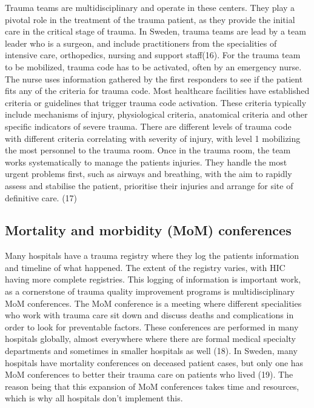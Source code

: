 \documentclass[
]{article}
\begin{document}
Trauma teams are multidisciplinary and operate in these centers. They
play a pivotal role in the treatment of the trauma patient, as they
provide the initial care in the critical stage of trauma. In Sweden,
trauma teams are lead by a team leader who is a surgeon, and include
practitioners from the specialities of intensive care, orthopedics,
nursing and support staff(16). For the trauma team to be mobilized,
trauma code has to be activated, often by an emergency nurse. The nurse
uses information gathered by the first responders to see if the patient
fits any of the criteria for trauma code. Most healthcare facilities
have established criteria or guidelines that trigger trauma code
activation. These criteria typically include mechanisms of injury,
physiological criteria, anatomical criteria and other specific
indicators of severe trauma. There are different levels of trauma code
with different criteria correlating with severity of injury, with level
1 mobilizing the most personnel to the trauma room. Once in the trauma
room, the team works systematically to manage the patients injuries.
They handle the most urgent problems first, such as airways and
breathing, with the aim to rapidly assess and stabilise the patient,
prioritise their injuries and arrange for site of definitive care. (17)

\hypertarget{mortality-and-morbidity-mom-conferences}{%
\subsection{Mortality and morbidity (MoM)
conferences}\label{mortality-and-morbidity-mom-conferences}}

Many hospitals have a trauma registry where they log the patients
information and timeline of what happened. The extent of the registry
varies, with HIC having more complete registries. This logging of
information is important work, as a cornerstone of trauma quality
improvement programs is multidisciplinary MoM conferences. The MoM
conference is a meeting where different specialities who work with
trauma care sit down and discuss deaths and complications in order to
look for preventable factors. These conferences are performed in many
hospitals globally, almost everywhere where there are formal medical
specialty departments and sometimes in smaller hospitals as well (18).
In Sweden, many hospitals have mortality conferences on deceased patient
cases, but only one has MoM conferences to better their trauma care on
patients who lived (19). The reason being that this expansion of MoM
conferences takes time and resources, which is why all hospitals don't
implement this.
\end{document}
